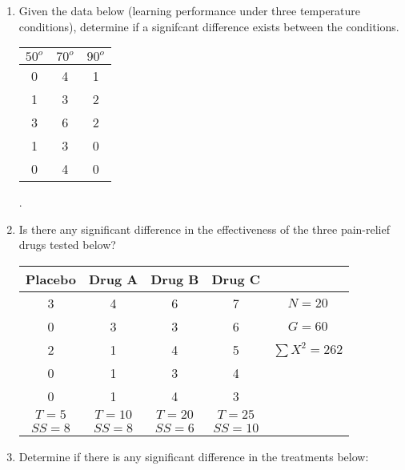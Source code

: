 \documentclass[11pt]{article}%
\begin{document}
\mbox{}
\large
\begin{enumerate}

\item Given the data below (learning performance under three temperature conditions), determine if a signifcant difference exists between the conditions.

\begin{table}[h!]
	\begin{center}
	\begin{tabular}{ccc}
		$50^o$ & $70^o$ & $90^o$\\
		\hline
		0 & 4 & 1\\
		1 & 3 & 2\\
		3 & 6 & 2\\
		1 & 3 & 0\\
		0 & 4 & 0\\
		\hline
		
	\end{tabular}
	\end{center}

\end{table}

\newpage
.
\newpage

\item Is there any significant difference in the effectiveness of the three pain-relief drugs tested below?  

 \begin{table}[h!]
	\begin{center}
	\begin{tabular}{ccccc}
		Placebo & Drug A & Drug B & Drug C &  \\
		\hline
		3 & 4 & 6 & 7 & $N=20$\\
		0 & 3 & 3 & 6 & $G=60$\\
		2 & 1 & 4 & 5 & $\sum X^2=262$\\
		0 & 1 & 3 & 4 & \\
		0 & 1 & 4 & 3 & \\
		\hline
		$T=5$ & $T=10$ & $T=20$ & $T=25$ & \\
		$SS=8$ & $SS=8$ & $SS=6$ & $SS=10$ & \\
		\hline
		
	\end{tabular}
	\end{center}
	
\end{table}

\newpage

\item Determine if there is any significant difference in the treatments below:


\end{enumerate}
\end{document}
